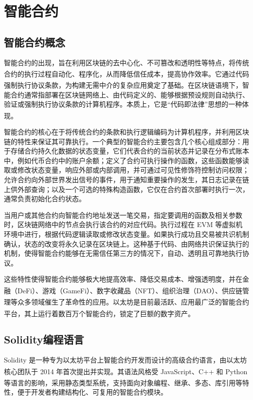 \documentclass[print, master, vlined, timesmath]{DissertUESTC}
\begin{document}
\section{智能合约}


\subsection{智能合约概念}
智能合约的出现，旨在利用区块链的去中心化、不可篡改和透明性等特点，将传统合约的执行过程自动化、程序化，从而降低信任成本，提高协作效率\textsuperscript{\cite{...}}。它通过代码强制执行协议条款，为构建无需中介的复杂应用奠定了基础\textsuperscript{\cite{...}}。在区块链语境下，智能合约通常指部署在区块链网络上、由代码定义的、能够根据预设规则自动执行、验证或强制执行协议条款的计算机程序。本质上，它是“代码即法律”思想的一种体现\textsuperscript{\cite{...}}。

智能合约的核心在于将传统合约的条款和执行逻辑编码为计算机程序，并利用区块链的特性来保证其可靠执行。一个典型的智能合约主要包含几个核心组成部分：用于存储合约持久化数据的状态变量，它们代表合约的当前状态并记录在分布式账本中，例如代币合约中的账户余额；定义了合约可执行操作的函数，这些函数能够读取或修改状态变量，响应外部或内部调用，并可通过可见性修饰符控制访问权限；允许合约向外部世界发出信号的事件，用于通知重要操作的发生，其日志记录在链上供外部查询；以及一个可选的特殊构造函数，它仅在合约首次部署时执行一次，通常负责初始化合约状态。

当用户或其他合约向智能合约地址发送一笔交易，指定要调用的函数及相关参数时，区块链网络中的节点会执行该合约的对应代码。执行过程在 EVM 等虚拟机环境中进行，根据代码逻辑读取或修改状态变量。如果执行成功且交易被共识机制确认，状态的改变将永久记录在区块链上。这种基于代码、由网络共识保证执行的机制，使得智能合约能够在无需信任第三方的情况下，自动、透明且可靠地执行协议。

这些特性使得智能合约能够极大地提高效率、降低交易成本、增强透明度，并在金融（DeFi）\textsuperscript{\cite{...}}、游戏（GameFi）\textsuperscript{\cite{...}}、数字收藏品（NFT）\textsuperscript{\cite{...}}、组织治理（DAO）\textsuperscript{\cite{...}}、供应链管理\textsuperscript{\cite{...}}等众多领域催生了革命性的应用。以太坊是目前最活跃、应用最广泛的智能合约平台，其上运行着数百万个智能合约，锁定了巨额的数字资产\textsuperscript{\cite{...}}。

\subsection{Solidity编程语言}

Solidity 是一种专为以太坊平台上智能合约开发而设计的高级合约语言，由以太坊核心团队于 2014 年首次提出并实现\textsuperscript{\cite{...}}。其语法风格受 JavaScript、C++ 和 Python 等语言的影响\textsuperscript{\cite{...}}，采用静态类型系统，支持面向对象编程、继承、多态、库引用等特性，便于开发者构建结构化、可复用的智能合约模块。
\end{document}
